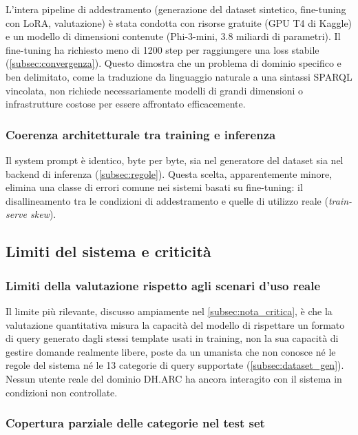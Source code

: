 \documentclass[12pt,a4paper,oneside]{book}
\begin{document}
L'intera pipeline di addestramento (generazione del dataset sintetico, fine-tuning con LoRA, valutazione) è stata condotta con risorse gratuite (GPU T4 di Kaggle) e un modello di dimensioni contenute (Phi-3-mini, 3.8 miliardi di parametri). Il fine-tuning ha richiesto meno di 1200 step per raggiungere una loss stabile (\cref{subsec:convergenza}). Questo dimostra che un problema di dominio specifico e ben delimitato, come la traduzione da linguaggio naturale a una sintassi SPARQL vincolata, non richiede necessariamente modelli di grandi dimensioni o infrastrutture costose per essere affrontato efficacemente.

\subsubsection{Coerenza architetturale tra training e inferenza}

Il system prompt è identico, byte per byte, sia nel generatore del dataset sia nel backend di inferenza (\cref{subsec:regole}). Questa scelta, apparentemente minore, elimina una classe di errori comune nei sistemi basati su fine-tuning: il disallineamento tra le condizioni di addestramento e quelle di utilizzo reale (\textit{train-serve skew}).

\subsection{Limiti del sistema e criticità}\label{subsec:punti_modestia}

\subsubsection{Limiti della valutazione rispetto agli scenari d'uso reale}

Il limite più rilevante, discusso ampiamente nel \cref{subsec:nota_critica}, è che la valutazione quantitativa misura la capacità del modello di rispettare un formato di query generato dagli stessi template usati in training, non la sua capacità di gestire domande realmente libere, poste da un umanista che non conosce né le regole del sistema né le 13 categorie di query supportate (\cref{subsec:dataset_gen}). Nessun utente reale del dominio DH.ARC ha ancora interagito con il sistema in condizioni non controllate.

\subsubsection{Copertura parziale delle categorie nel test set}
\end{document}
